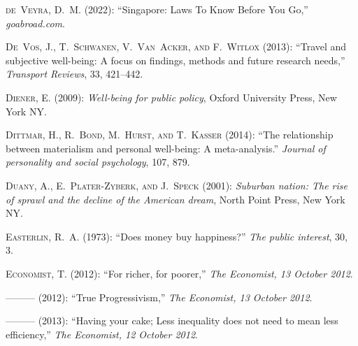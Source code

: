 \documentclass[10pt, letterpaper]{article}
\begin{document}
\begin{spacing}{2}
\begin{thebibliography}{120}
\textsc{de~Veyra, D.~M.} (2022): \enquote{Singapore: Laws To Know Before You
  Go,} \emph{goabroad.com}.

\textsc{De~Vos, J., T.~Schwanen, V.~Van~Acker, and F.~Witlox} (2013):
  \enquote{Travel and subjective well-being: A focus on findings, methods and
  future research needs,} \emph{Transport Reviews}, 33, 421--442.

\textsc{Diener, E.} (2009): \emph{Well-being for public policy}, Oxford
  University Press, New York NY.

\textsc{Dittmar, H., R.~Bond, M.~Hurst, and T.~Kasser} (2014): \enquote{The
  relationship between materialism and personal well-being: A meta-analysis.}
  \emph{Journal of personality and social psychology}, 107, 879.

\textsc{Duany, A., E.~Plater-Zyberk, and J.~Speck} (2001): \emph{Suburban
  nation: The rise of sprawl and the decline of the American dream}, North
  Point Press, New York NY.

\textsc{Easterlin, R.~A.} (1973): \enquote{Does money buy happiness?} \emph{The
  public interest}, 30, 3.

\textsc{Economist, T.} (2012{}): \enquote{For richer, for poorer,}
  \emph{The Economist, 13 October 2012}.

---\hspace{-.1pt}---\hspace{-.1pt}--- (2012{}): \enquote{True
  Progressivism,} \emph{The Economist, 13 October 2012}.

---\hspace{-.1pt}---\hspace{-.1pt}--- (2013): \enquote{Having your cake; Less
  inequality does not need to mean less efficiency,} \emph{The Economist, 12
  October 2012}.


\end{thebibliography}
\end{spacing}
\end{document}
